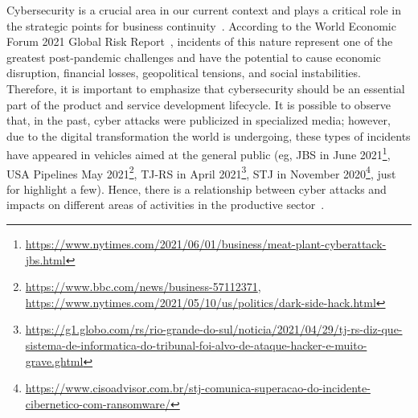 




Cybersecurity is a crucial area in our current context and plays a critical role in the strategic points for business continuity~\cite{wef}. According to the World Economic Forum 2021 Global Risk Report~\cite{wefrep2021}, incidents of this nature represent one of the greatest post-pandemic challenges and have the potential to cause economic disruption, financial losses, geopolitical tensions, and social instabilities. Therefore, it is important to emphasize that cybersecurity should be an essential part of the product and service development lifecycle. It is possible to observe that, in the past, cyber attacks were publicized in specialized media; however, due to the digital transformation the world is undergoing, these types of incidents have appeared in vehicles aimed at the general public (eg, JBS in June 2021\footnote{\url{https://www.nytimes.com/2021/06/01/business/meat-plant-cyberattack-jbs.html}}, USA Pipelines May 2021\footnote{\url{https://www.bbc.com/news/business-57112371}, \url{https://www.nytimes.com/2021/05/10/us/politics/dark-side-hack.html}}, TJ-RS in April 2021\footnote{\url{https://g1.globo.com/rs/rio-grande-do-sul/noticia/2021/04/29/tj-rs-diz-que-sistema-de-informatica-do-tribunal-foi-alvo-de-ataque-hacker-e-muito-grave.ghtml}}, STJ in November 2020\footnote{\url{https://www.cisoadvisor.com.br/stj-comunica-superacao-do-incidente-cibernetico-com-ransomware/}}, just for highlight a few). Hence, there is a relationship between cyber attacks and impacts on different areas of activities in the productive sector~\cite{costs}.

